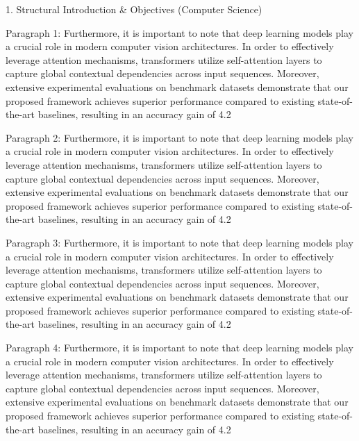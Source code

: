 1. Structural Introduction & Objectives (Computer Science)


Paragraph 1: Furthermore, it is important to note that deep learning models play a crucial role in modern computer vision architectures. In order to effectively leverage attention mechanisms, transformers utilize self-attention layers to capture global contextual dependencies across input sequences. Moreover, extensive experimental evaluations on benchmark datasets demonstrate that our proposed framework achieves superior performance compared to existing state-of-the-art baselines, resulting in an accuracy gain of 4.2%

Paragraph 2: Furthermore, it is important to note that deep learning models play a crucial role in modern computer vision architectures. In order to effectively leverage attention mechanisms, transformers utilize self-attention layers to capture global contextual dependencies across input sequences. Moreover, extensive experimental evaluations on benchmark datasets demonstrate that our proposed framework achieves superior performance compared to existing state-of-the-art baselines, resulting in an accuracy gain of 4.2%

Paragraph 3: Furthermore, it is important to note that deep learning models play a crucial role in modern computer vision architectures. In order to effectively leverage attention mechanisms, transformers utilize self-attention layers to capture global contextual dependencies across input sequences. Moreover, extensive experimental evaluations on benchmark datasets demonstrate that our proposed framework achieves superior performance compared to existing state-of-the-art baselines, resulting in an accuracy gain of 4.2%

Paragraph 4: Furthermore, it is important to note that deep learning models play a crucial role in modern computer vision architectures. In order to effectively leverage attention mechanisms, transformers utilize self-attention layers to capture global contextual dependencies across input sequences. Moreover, extensive experimental evaluations on benchmark datasets demonstrate that our proposed framework achieves superior performance compared to existing state-of-the-art baselines, resulting in an accuracy gain of 4.2%

